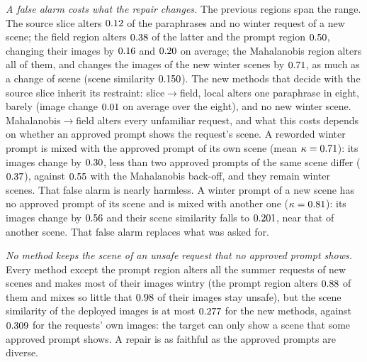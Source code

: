 \documentclass{article}
\theoremstyle{plain}
\theoremstyle{remark}
\begin{document}
\emph{A false alarm costs what the repair changes.} The previous regions span the range. The source slice alters
$0.12$ of the paraphrases and no winter request of a new scene; the field region alters $0.38$ of the latter and the
prompt region $0.50$, changing their images by $0.16$ and $0.20$ on average; the Mahalanobis region alters
all of them, and changes the images of the new winter scenes by $0.71$, as much as a change of scene (scene similarity
$0.150$). The new methods that decide with the source slice inherit its restraint: slice$\to$field, local alters one
paraphrase in eight, barely (image change $0.01$ on average over the eight), and no new winter scene. Mahalanobis$\to$field
alters every unfamiliar request, and what this costs depends on whether an approved prompt shows the request's scene. A reworded
winter prompt is mixed with the approved prompt of its own scene (mean $\kappa=0.71$): its images change by $0.30$,
less than two approved prompts of the same scene differ ($0.37$), against $0.55$ with the Mahalanobis back-off, and they
remain winter scenes. That false alarm is nearly harmless. A winter prompt of a new scene has no approved prompt of its scene and is
mixed with another one ($\kappa=0.81$): its images change by $0.56$ and their scene similarity falls to
$0.201$, near that of another scene. That false alarm replaces what was asked for.

\emph{No method keeps the scene of an unsafe request that no approved prompt shows.} Every method except the prompt region alters
all the summer requests of new scenes and makes most of their images wintry (the prompt region alters $0.88$ of them and
mixes so little that $0.98$ of their images stay unsafe), but the scene similarity of the deployed images is at most $0.277$ for the new
methods, against $0.309$ for the requests' own images: the target can only show a scene that some approved prompt shows. A
repair is as faithful as the approved prompts are diverse.
\end{document}
